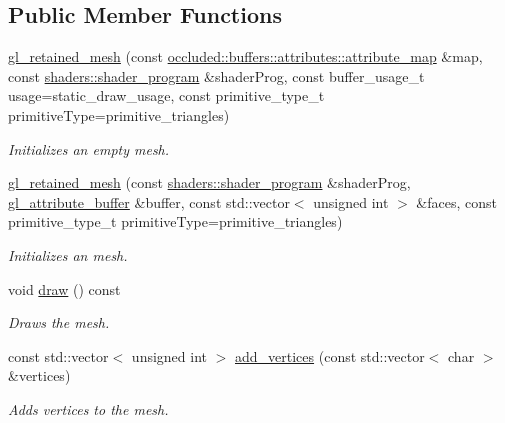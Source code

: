 \subsection*{Public Member Functions}
\begin{DoxyCompactItemize}
\item 
\hyperlink{classoccluded_1_1opengl_1_1retained_1_1gl__retained__mesh_aab98caf76863522b8c67e3d2bb632592}{gl\+\_\+retained\+\_\+mesh} (const \hyperlink{classoccluded_1_1buffers_1_1attributes_1_1attribute__map}{occluded\+::buffers\+::attributes\+::attribute\+\_\+map} \&map, const \hyperlink{classoccluded_1_1opengl_1_1retained_1_1shaders_1_1shader__program}{shaders\+::shader\+\_\+program} \&shader\+Prog, const buffer\+\_\+usage\+\_\+t usage=static\+\_\+draw\+\_\+usage, const primitive\+\_\+type\+\_\+t primitive\+Type=primitive\+\_\+triangles)
\begin{DoxyCompactList}\small\item\em Initializes an empty mesh. \end{DoxyCompactList}\item 
\hyperlink{classoccluded_1_1opengl_1_1retained_1_1gl__retained__mesh_a6923146a8f5f8b092b3f92d6d910b2cd}{gl\+\_\+retained\+\_\+mesh} (const \hyperlink{classoccluded_1_1opengl_1_1retained_1_1shaders_1_1shader__program}{shaders\+::shader\+\_\+program} \&shader\+Prog, \hyperlink{classoccluded_1_1opengl_1_1retained_1_1gl__attribute__buffer}{gl\+\_\+attribute\+\_\+buffer} \&buffer, const std\+::vector$<$ unsigned int $>$ \&faces, const primitive\+\_\+type\+\_\+t primitive\+Type=primitive\+\_\+triangles)
\begin{DoxyCompactList}\small\item\em Initializes an mesh. \end{DoxyCompactList}\item 
void \hyperlink{classoccluded_1_1opengl_1_1retained_1_1gl__retained__mesh_aa2018120d3a1dcca990e85a24efe20fb}{draw} () const 
\begin{DoxyCompactList}\small\item\em Draws the mesh. \end{DoxyCompactList}\item 
const std\+::vector$<$ unsigned int $>$ \hyperlink{classoccluded_1_1opengl_1_1retained_1_1gl__retained__mesh_af1df11c76aefccc2bd9b67f839bfcbb8}{add\+\_\+vertices} (const std\+::vector$<$ char $>$ \&vertices)
\begin{DoxyCompactList}\small\item\em Adds vertices to the mesh. \end{DoxyCompactList}\item 

\end{DoxyCompactItemize}
